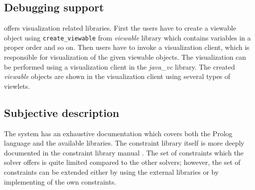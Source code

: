 \subsection{Debugging support}
\eclipse offers visualization related libraries. First the users have to create a 
viewable object using \texttt{create\_viewable} from {\em viewable} library which 
contains variables in a proper order and so on. Then
users have to invoke a visualization client, which is responsible for visualization of the 
given viewable objects. The visualization can be performed using a visualization client
in the {\em java\_vc} library. The created {\em viewable} objects are shown in
the visualization client using several types of viewlets.  


\subsection{Subjective description}
The \eclipse system has an exhaustive documentation \cite{eclipse:tutorial} which covers both the Prolog language
and the available libraries. The constraint library itself is more deeply documented
in the constraint library manual \cite{eclipse:cspmanual}. The set of constraints which the solver offers
is quite limited compared to the other solvers; however, the set of constraints can be extended 
either by using the external libraries or by implementing of the own constraints.

 